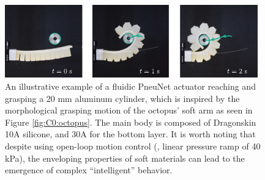 \begin{figure}
\centering
\vspace{-2mm}
\includegraphics*[width=0.975\textwidth]{./pdf/thesis-figurex-1-3-2.pdf}
\caption{\small An illustrative example of a fluidic PneuNet actuator \cite{Mosadegh2014} reaching and grasping a 20 \si{\milli \meter} aluminum cylinder, which is inspired by the morphological grasping motion of the octopus' soft arm \cite{Sumbre2001Sep} as seen in Figure \ref{fig:C0:octopus}. The main body is composed of Dragonskin\texttrademark\, 10A silicone, and 30A for the bottom layer. It is worth noting that despite using open-loop motion control (\ie, linear pressure ramp of 40 \si{\kilo \pascal}), the enveloping properties of soft materials can lead to the emergence of complex ``intelligent'' behavior. \label{fig:C0:pneunetGrasp}}
\vspace{-5mm}
\end{figure}
    
